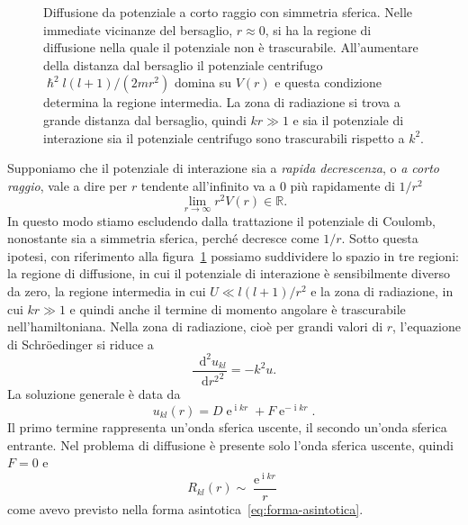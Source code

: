 \documentclass[a4paper,fleqn,twoside,12pt]{article}
\newcommand*{\dd}{\mathop{}\!\mathrm{d}} %
\DeclareMathOperator{\e}{\mathrm{e}} %
\DeclareMathOperator{\uimm}{\mathrm{i}} %
\newcommand*{\toder}[3][]{\frac{{\dd^{#1}}#2}{\dd {#3}^{#1}}}
\begin{document}
\begin{figure}
  \centering
  \caption{Diffusione da potenziale a corto raggio con simmetria sferica.  Nelle
    immediate vicinanze del bersaglio, $r \approx 0$, si ha la regione di
    diffusione nella quale il potenziale non è trascurabile.  All'aumentare
    della distanza dal bersaglio il potenziale centrifugo
    $\hslash^2 l(l+1)/(2mr^2)$ domina su $V(r)$ e questa condizione determina la
    regione intermedia.  La zona di radiazione si trova a grande distanza dal
    bersaglio, quindi $kr \gg 1$ e sia il potenziale di interazione sia il
    potenziale centrifugo sono trascurabili rispetto a $k^2$.}
\label{fig:regioni-potenziale-sferico}
\end{figure}
Supponiamo che il potenziale di interazione sia a \emph{rapida decrescenza}, o
\emph{a corto raggio}, vale a dire per $r$ tendente all'infinito va a $0$ più
rapidamente di $1/r^{2}$
\begin{equation}
  \lim_{r \to \infty} r^{2}V(r) \in \mathbb{R}.
\end{equation}
In questo modo stiamo escludendo dalla trattazione il potenziale di Coulomb,
nonostante sia a simmetria sferica, perché decresce come $1/r$.
Sotto questa ipotesi, con riferimento alla
figura~\ref{fig:regioni-potenziale-sferico} possiamo suddividere lo spazio in
tre regioni: la regione di diffusione, in cui il potenziale di interazione è
sensibilmente diverso da zero, la regione intermedia in cui $U \ll l(l+1)/r^{2}$
e la zona di radiazione, in cui $kr \gg 1$ e quindi anche il termine di momento
angolare è trascurabile nell'hamiltoniana.  Nella zona di radiazione, cioè per
grandi valori di $r$, l'equazione di Schröedinger si riduce a
\begin{equation}
  \toder[2]{u_{kl}}{r^{2}} = -k^{2}u.
\end{equation}
La soluzione generale è data da
\begin{equation}
  u_{kl}(r) = D\e^{\uimm kr} + F\e^{-\uimm kr}.
\end{equation}
Il primo termine rappresenta un'onda sferica uscente, il secondo un'onda sferica
entrante.  Nel problema di diffusione è presente solo l'onda sferica uscente,
quindi $F = 0$ e
\begin{equation}
  R_{kl}(r) \sim \frac{\e^{\uimm kr}}{r}
\end{equation}
come avevo previsto nella forma asintotica~\eqref{eq:forma-asintotica}.
\end{document}
